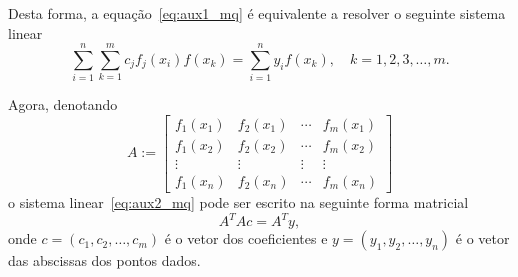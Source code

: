 Desta forma, a equação~\eqref{eq:aux1_mq} é equivalente a resolver o seguinte sistema linear
\begin{equation}\label{eq:aux2_mq}
  \sum_{i=1}^n\sum_{k=1}^m c_jf_j(x_i)f(x_k) = \sum_{i=1}^n y_if(x_k),\quad k=1, 2, 3, \dotsc, m.
\end{equation}

Agora, denotando
\begin{equation}
  A :=
  \begin{bmatrix}
    f_1(x_1) & f_2(x_1) & \cdots & f_m(x_1) \\
    f_1(x_2) & f_2(x_2) & \cdots & f_m(x_2) \\
    \vdots & \vdots & \vdots & \vdots \\
    f_1(x_n) & f_2(x_n) & \cdots & f_m(x_n)
  \end{bmatrix}
\end{equation}
o sistema linear~\eqref{eq:aux2_mq} pode ser escrito na seguinte forma matricial
\begin{equation}\label{eq:equacoes_normais}
  A^TAc= A^Ty,
\end{equation}
onde $c = (c_1, c_2, \dotsc, c_m)$ é o vetor dos coeficientes e $y = (y_1, y_2, \dotsc, y_n)$ é o vetor das abscissas dos pontos dados.

